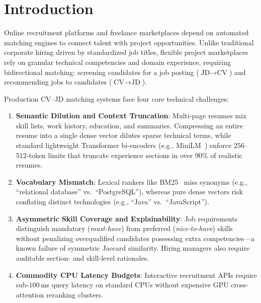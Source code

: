 \section{Introduction}

Online recruitment platforms and freelance marketplaces depend on automated matching engines to connect talent with project opportunities. Unlike traditional corporate hiring driven by standardized job titles, flexible project marketplaces rely on granular technical competencies and domain experience, requiring bidirectional matching: screening candidates for a job posting ($\text{JD} \rightarrow \text{CV}$) and recommending jobs to candidates ($\text{CV} \rightarrow \text{JD}$).

Production CV--JD matching systems face four core technical challenges:
\begin{enumerate}
    \item \textbf{Semantic Dilution and Context Truncation}: Multi-page resumes mix skill lists, work history, education, and summaries. Compressing an entire resume into a single dense vector dilutes sparse technical terms, while standard lightweight Transformer bi-encoders (e.g., MiniLM~\cite{reimers2019sentencebert}) enforce $256$--$512$-token limits that truncate experience sections in over $90\%$ of realistic resumes.
    \item \textbf{Vocabulary Mismatch}: Lexical rankers like BM25~\cite{robertson2009probabilistic} miss synonyms (e.g., ``relational database'' vs.\ ``PostgreSQL''), whereas pure dense vectors risk conflating distinct technologies (e.g., ``Java'' vs.\ ``JavaScript'').
    \item \textbf{Asymmetric Skill Coverage and Explainability}: Job requirements distinguish mandatory (\textit{must-have}) from preferred (\textit{nice-to-have}) skills without penalizing overqualified candidates possessing extra competencies---a known failure of symmetric Jaccard similarity. Hiring managers also require auditable section- and skill-level rationales.
    \item \textbf{Commodity CPU Latency Budgets}: Interactive recruitment APIs require sub-$100$\,ms query latency on standard CPUs without expensive GPU cross-attention reranking clusters.
\end{enumerate}

